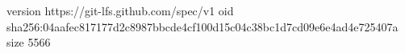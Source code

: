 version https://git-lfs.github.com/spec/v1
oid sha256:04aafec817177d2c8987bbcde4cf100d15c04c38bc1d7cd09e6e4ad4e725407a
size 5566
